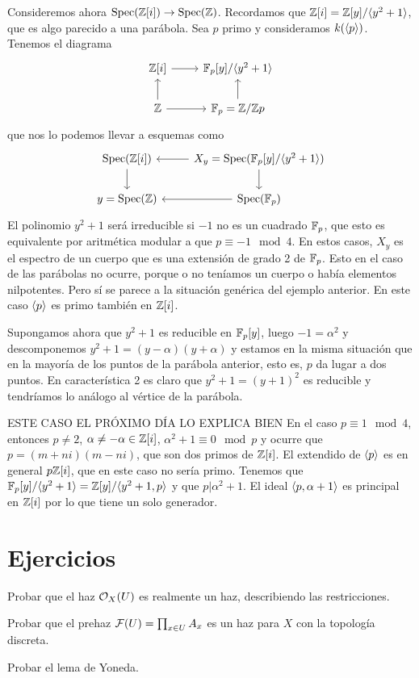 \documentclass[GA.tex]{subfiles}
\begin{document}
\begin{ej}
Consideremos ahora $\operatorname{Spec}(\mathbb{Z}[i])\to \operatorname{Spec}(\mathbb{Z})$. Recordamos que $\mathbb{Z}[i]=\mathbb{Z}[y]/\langle{y^2+1}\rangle$, que es algo parecido a una parábola. Sea $p$ primo y consideramos $k(\langle{p}\rangle)$. Tenemos el diagrama 
\[
\begin{tikzcd}
\Z[i]\arrow[r] & \F_p[y]/\gene{y^2+1}\\
\Z\arrow[u]\arrow[r] & \F_p=\Z/\Z p\arrow[u]
\end{tikzcd}
\]
que nos lo podemos llevar a esquemas como
\[
\begin{tikzcd}
\spec(\Z[i])\arrow[d] & X_y=\spec(\F_p[y]/\gene{y^2+1})\arrow[d]\arrow[l]\\
y=\spec(\Z) & \spec(\F_p)\arrow[l]
\end{tikzcd}
\]
El polinomio $y^2+1$ será irreducible si $-1$ no es un cuadrado $\mathbb{F}_p$, que esto es equivalente por aritmética modular a que $p\equiv -1\mod 4$. En estos casos, $X_y$ es el espectro de un cuerpo que es una extensión de grado 2 de $\mathbb{F}_p$. Esto en el caso de las parábolas no ocurre, porque o no teníamos un cuerpo o había elementos nilpotentes. Pero sí se parece a la situación genérica del ejemplo anterior. En este caso $\langle{p}\rangle$ es primo también en $\mathbb{Z}[i]$. 

Supongamos ahora que $y^2+1$ es reducible en $\mathbb{F}_p[y]$, luego $-1=\alpha^2$ y descomponemos $y^2+1=(y-\alpha)(y+\alpha)$ y estamos en la misma situación que en la mayoría de los puntos de la parábola anterior, esto es, $p$ da lugar a dos puntos. En característica 2 es claro que $y^2+1=(y+1)^2$ es reducible y tendríamos lo análogo al vértice de la parábola. 


ESTE CASO EL PRÓXIMO DÍA LO EXPLICA BIEN
En el caso $p\equiv 1\mod 4$, entonces $p\neq 2$, $\alpha\neq-\alpha\in\mathbb{Z}[i]$, $\alpha^2+1\equiv 0\mod p$ y ocurre que $p=(m+ni)(m-ni)$, que son dos primos de $\mathbb{Z}[i]$. El extendido de $\langle{p}\rangle$ es en general $p\mathbb{Z}[i]$, que en este caso no sería primo. Tenemos que $\mathbb{F}_p[y]/\langle{y^2+1}\rangle=\mathbb{Z}[y]/\langle{y^2+1,p}\rangle$ y que $p|\alpha^2+1$. El ideal $\langle{p,\alpha+1}\rangle$ es principal en $\mathbb{Z}[i]$ por lo que tiene un solo generador.

\end{ej}




\section{Ejercicios}
\begin{ejer}
Probar que el haz ${\mathcal O}_X(U)$ es realmente un haz, describiendo las restricciones. 
\end{ejer}
\begin{ejer}
Probar que el prehaz $\mathcal{F}(U)=\prod_{x\in U} A_x$ es un haz para $X$ con la topología discreta. 
\end{ejer}
\begin{ejer}
Probar el lema de Yoneda. 
\end{ejer}
\end{document}
